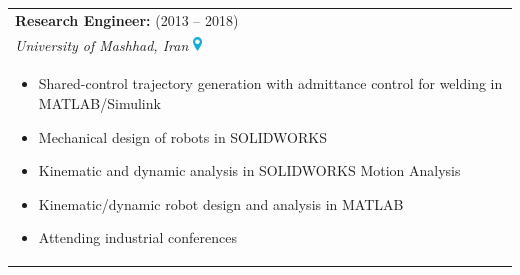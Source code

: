 \documentclass[lighthipster]{simplehipstercv}
\newlength{\rightcolwidth}
\begin{document}
\begin{paracol}{2}
\begin{table}[h]
\begin{tabularx}{\linewidth}{X}
				\vspace{0.01cm}
				\textbf{Research Engineer:} (2013 -- 2018) \\ \textit{University of Mashhad, Iran} \includegraphics[height=0.35cm]{files/location.pdf} \\
				\vspace{-0.3cm}
				\begin{itemize}[leftmargin=1em, itemsep=0pt, topsep=0pt]
					\item Shared-control trajectory generation with admittance control for welding in MATLAB/Simulink
					\item Mechanical design of robots in SOLIDWORKS
					\item Kinematic and dynamic analysis in SOLIDWORKS Motion Analysis
					\item Kinematic/dynamic robot design and analysis in MATLAB
					\item Attending industrial conferences
				\end{itemize} \\
			\end{tabularx}
		\end{table}
		
		
		
	
	
		\vspace{10em}
		
		\bigskip
			
		\vfill{} %
		
		\setlength{\parindent}{0pt}
		
	\end{paracol}
	
\end{document}
